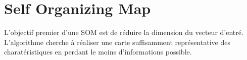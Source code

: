 \chapter{Self Organizing Map}

L'objectif premier d'une SOM est de réduire la dimension du vecteur d'entré.
L'algorithme cherche à réaliser une carte suffisamment représentative des charatéristiques en perdant le moins d'informations possible.
